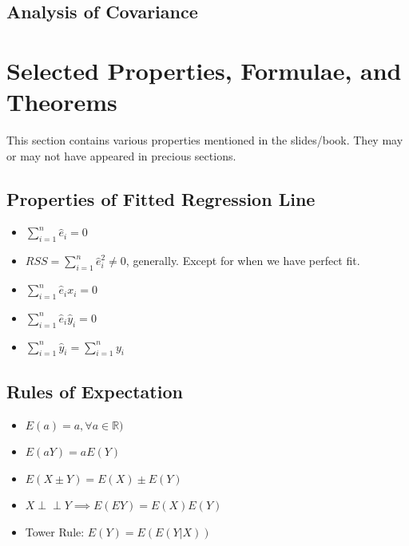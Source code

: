 \documentclass[11pt]{article}
\newcommand{\real}{\mathbb{R}}
\newcommand{\independent}{\perp \!\!\! \perp}
\begin{document}
\subsection{Analysis of Covariance}



\newpage
\section{Selected Properties, Formulae, and Theorems}
This section contains various properties mentioned in the slides/book. They may or may not have appeared in precious sections. 
\subsection{Properties of Fitted Regression Line}
\begin{itemize}
    \item $\sum_{i = 1}^n \hat{e}_i = 0$
    \item $RSS = \sum_{i = 1}^n \hat{e}_i^2 \neq 0$, generally. Except for when we have perfect fit.
    \item $\sum_{i= 1}^n \hat{e}_i x_i = 0$
    \item $\sum_{i= 1}^n \hat{e}_i \hat{y}_i = 0$
    \item $\sum_{i = 1}^n \hat{y}_i = \sum_{i= 1}^n y_i$
\end{itemize}

\subsection{Rules of Expectation}
\begin{itemize}
    \item $E(a) = a, \forall a \in \real)$
    \item $E(aY) = aE(Y)$
    \item $E(X \pm Y) = E(X) \pm E(Y)$
    \item $X\independent Y \implies E(EY) = E(X) E(Y)$
    \item Tower Rule: $E(Y) = E(E(Y|X))$
\end{itemize}
\end{document}
